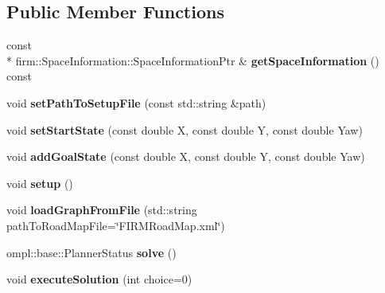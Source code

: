 \subsection*{Public Member Functions}
\begin{DoxyCompactItemize}
\item 
\hypertarget{class_f_i_r_m2_d_setup_aa6f27218500fa3745f32058455561c1c}{const \\*
firm\-::\-Space\-Information\-::\-Space\-Information\-Ptr \& {\bfseries get\-Space\-Information} () const }\label{class_f_i_r_m2_d_setup_aa6f27218500fa3745f32058455561c1c}

\item 
\hypertarget{class_f_i_r_m2_d_setup_af0901d59266d8e4bbffb528bb54b00ea}{void {\bfseries set\-Path\-To\-Setup\-File} (const std\-::string \&path)}\label{class_f_i_r_m2_d_setup_af0901d59266d8e4bbffb528bb54b00ea}

\item 
\hypertarget{class_f_i_r_m2_d_setup_ac443e8ff6d0145b931273be3f2a70001}{void {\bfseries set\-Start\-State} (const double X, const double Y, const double Yaw)}\label{class_f_i_r_m2_d_setup_ac443e8ff6d0145b931273be3f2a70001}

\item 
\hypertarget{class_f_i_r_m2_d_setup_ae94111988457f7c72e1c632df8003be1}{void {\bfseries add\-Goal\-State} (const double X, const double Y, const double Yaw)}\label{class_f_i_r_m2_d_setup_ae94111988457f7c72e1c632df8003be1}

\item 
\hypertarget{class_f_i_r_m2_d_setup_a8482e93d8533533428cefb7f406bccf9}{void {\bfseries setup} ()}\label{class_f_i_r_m2_d_setup_a8482e93d8533533428cefb7f406bccf9}

\item 
\hypertarget{class_f_i_r_m2_d_setup_ab33fe3981e360125b44c7fe69a16c5ff}{void {\bfseries load\-Graph\-From\-File} (std\-::string path\-To\-Road\-Map\-File=\char`\"{}F\-I\-R\-M\-Road\-Map.\-xml\char`\"{})}\label{class_f_i_r_m2_d_setup_ab33fe3981e360125b44c7fe69a16c5ff}

\item 
\hypertarget{class_f_i_r_m2_d_setup_aa86fe60267501bd9e1afd18154c64e41}{ompl\-::base\-::\-Planner\-Status {\bfseries solve} ()}\label{class_f_i_r_m2_d_setup_aa86fe60267501bd9e1afd18154c64e41}

\item 
\hypertarget{class_f_i_r_m2_d_setup_ae975619f40cb6d074e6ef478bce86bc3}{void {\bfseries execute\-Solution} (int choice=0)}\label{class_f_i_r_m2_d_setup_ae975619f40cb6d074e6ef478bce86bc3}


\end{DoxyCompactItemize}
